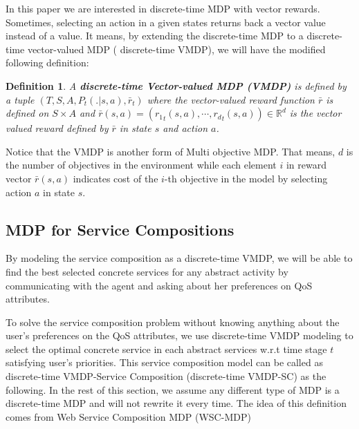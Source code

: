 \documentclass[10pt,journal,compsoc]{IEEEtran}
\newtheorem{definition}{Definition}
\begin{document}
In this  paper we are interested in discrete-time MDP with vector rewards. Sometimes, selecting an action in a given states returns back a vector value instead of a value. It means, by extending the discrete-time MDP to a discrete-time vector-valued MDP ( discrete-time VMDP), we will have the modified following definition: 

\begin{definition} \cite{alizadeh:hal-01358345}
A \textbf{discrete-time Vector-valued MDP (VMDP)} is defined by a tuple $ (T, S, A, P_t(.|s,a), \bar{r}_t)$ where the vector-valued reward function $\bar{r}$ is defined on $S \times A$ and $\bar{r}(s, a) = ({r_1}_t(s,a), \cdots, {r_d}_t(s,a)) \in \mathbb{R}^d$ is the vector valued reward defined by $\bar{r}$ in state $s$ and action $a$. 
\end{definition}

Notice that the VMDP is another form of Multi objective MDP. That means, $d$ is the number of objectives in the environment while each element $i$ in reward vector $\bar{r}(s, a)$ indicates cost of the $i$-th objective in the model by selecting action $a$ in state $s$. 

\subsection{MDP for Service Compositions}

By modeling the service composition as a discrete-time VMDP, we will be able to find the best selected concrete services for any abstract activity by communicating with the agent and asking about her preferences on QoS attributes. 

To solve the service composition problem without knowing anything about the user's preferences on the QoS attributes, we use discrete-time VMDP modeling to select the optimal concrete service in each abstract services w.r.t time stage $t$ satisfying user's priorities. This service composition model can be called as discrete-time VMDP-Service Composition (discrete-time VMDP-SC) as the following. In the rest of this section, we assume any different type of MDP is a discrete-time MDP and will not rewrite it every time. The idea of this definition comes from Web Service Composition MDP (WSC-MDP) \cite{7121012,Wang2010,Moustafa2013}
\end{document}
